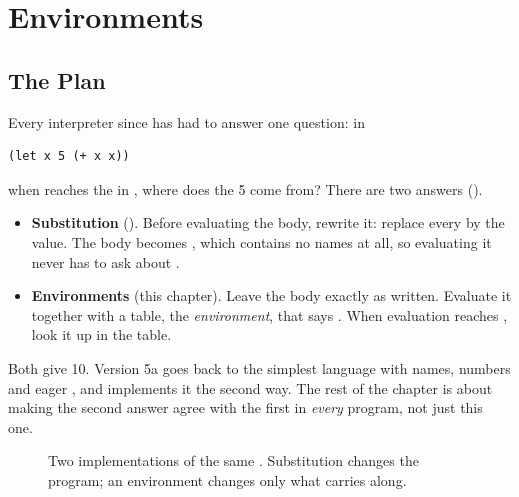 \section{Environments}
\label{sec:env}

\subsection{The Plan}

Every interpreter since  has had to answer one question: in
\begin{lstlisting}
(let x 5 (+ x x))
\end{lstlisting}
when  reaches the  in , where does the 5 come from? There are two answers ().
\begin{itemize}
  \item \textbf{Substitution} (). Before evaluating the body, rewrite it: replace every  by the value. The body becomes , which contains no names at all, so evaluating it never has to ask about .
  \item \textbf{Environments} (this chapter). Leave the body exactly as written. Evaluate it together with a table, the \emph{environment}, that says . When evaluation reaches , look it up in the table.
\end{itemize}
Both give 10. Version 5a goes back to the simplest language with names, numbers and eager , and implements it the second way. The rest of the chapter is about making the second answer agree with the first in \emph{every} program, not just this one.

\begin{figure}[htbp]
\centering
{}
\caption{Two implementations of the same . Substitution changes the program; an environment changes only what  carries along.}
\label{fig:twoways}
\end{figure}

